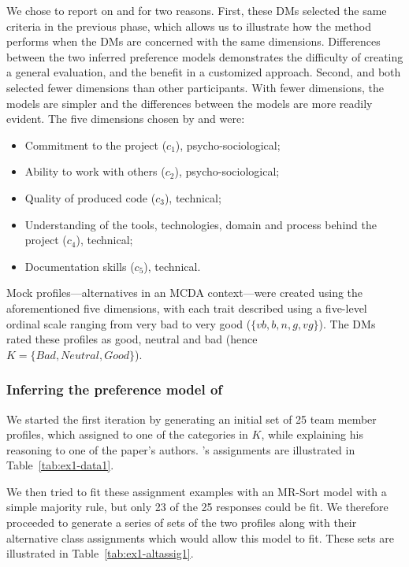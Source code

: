  We chose to report on \GJ and \DB for two reasons.
First, these DMs selected the same criteria in the previous phase,
which allows us to illustrate how the method performs when the DMs
are concerned with the same dimensions. Differences between the two
inferred preference models demonstrates the difficulty of creating a
general evaluation, and the benefit in a customized approach. Second,
\GJ and \DB both selected fewer dimensions than other participants.
With fewer dimensions, the models are simpler and the differences between
the models are more readily evident.
The five dimensions chosen by \GJ and \DB were:
\begin{itemize}
\item Commitment to the project ($c_1$), psycho-sociological;
\item Ability to work with others ($c_2$), psycho-sociological;
\item Quality of produced code ($c_3$), technical;
\item Understanding of the tools, technologies, domain and process behind the project ($c_4$), technical;
\item Documentation skills ($c_5$), technical.
\end{itemize}

Mock profiles---alternatives in an MCDA context---were created using the aforementioned five dimensions, with each trait described using a five-level ordinal scale ranging from very bad to very good ($\{vb, b, n, g, vg\}$). The DMs rated these profiles as good, neutral and bad (hence \\$K = \{Bad, Neutral, Good\}$).

\subsubsection{Inferring the preference model of \GJ}

We started the first iteration by generating an initial set of 25 team member profiles, which \GJ assigned to one of the categories in $K$, while explaining his reasoning to one of the paper's authors. \GJ's assignments are illustrated in Table~\ref{tab:ex1-data1}.



We then tried to fit these assignment examples with an MR-Sort model with a simple majority rule, but only 23 of the 25 responses could be fit. We therefore proceeded to generate a series of sets of the two profiles along with their alternative class assignments which would allow this model to fit. These sets are illustrated in Table~\ref{tab:ex1-altassig1}.

